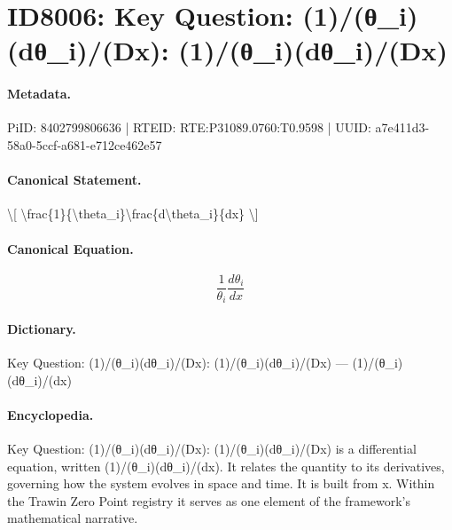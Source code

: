 \section*{ID8006: Key Question: (1)/(θ\_i)(dθ\_i)/(Dx): (1)/(θ\_i)(dθ\_i)/(Dx)}
\paragraph{Metadata.}
PiID: 8402799806636 | RTEID: RTE:P31089.0760:T0.9598 | UUID: a7e411d3-58a0-5ccf-a681-e712ce462e57

\paragraph{Canonical Statement.}
\textbackslash{}[ \textbackslash{}frac\{1\}\{\textbackslash{}theta\_i\}\textbackslash{}frac\{d\textbackslash{}theta\_i\}\{dx\} \textbackslash{}]

\paragraph{Canonical Equation.}
\[
\frac{1}{\theta_i}\frac{d\theta_i}{dx}
\]

\paragraph{Dictionary.}
Key Question: (1)/(θ\_i)(dθ\_i)/(Dx): (1)/(θ\_i)(dθ\_i)/(Dx) — (1)/(θ\_i)(dθ\_i)/(dx)

\paragraph{Encyclopedia.}
Key Question: (1)/(θ\_i)(dθ\_i)/(Dx): (1)/(θ\_i)(dθ\_i)/(Dx) is a differential equation, written (1)/(θ\_i)(dθ\_i)/(dx). It relates the quantity to its derivatives, governing how the system evolves in space and time. It is built from x. Within the Trawin Zero Point registry it serves as one element of the framework's mathematical narrative.
